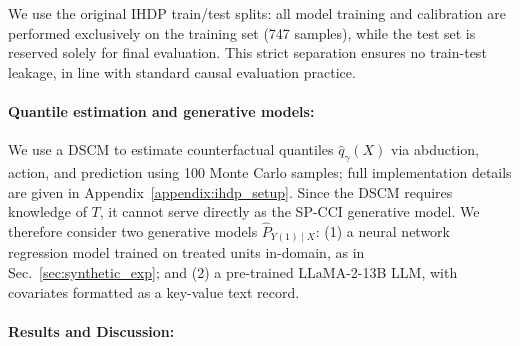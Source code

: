 \documentclass{article}
\theoremstyle{plain}
\theoremstyle{definition}
\theoremstyle{remark}
\begin{document}
We use the original IHDP train/test splits: all model training and calibration are performed exclusively on the training set (747 samples), while the test set is reserved solely for final evaluation. This strict separation ensures no train-test leakage, in line with standard causal evaluation practice.


\paragraph{Quantile estimation and generative models:} We use a DSCM \citep{pawlowski2020deep} to estimate counterfactual quantiles $\hat{q}_\gamma(X)$ via abduction, action, and prediction using 100 Monte Carlo samples; full implementation details are given in Appendix~\ref{appendix:ihdp_setup}. Since the DSCM requires knowledge of $T$, it cannot serve directly as the SP-CCI generative model. We therefore consider two generative models $\hat{P}_{Y(1)\mid X}$: (1) a neural network regression model trained on treated units in-domain, as in Sec.~\ref{sec:synthetic_exp}; and (2) a pre-trained LLaMA-2-13B LLM, with covariates formatted as a key-value text record.





\paragraph{Results and Discussion:}
\begin{table}
\vspace{-0.8em}
\centering
\small
{}
\caption{APIW and CVR on IHDP (50 runs, $\alpha=0.15$). For GESPI, two variants are shown: a lenient guardrail ($\alpha{+}\varepsilon{=}0.15$) and a tight guardrail (small $\varepsilon$). (LQ/MQ/HQ: label quality; LLM: LLaMA-2-13B)}
\label{tab:ihdp_width_results}
\vspace{-0.5em}
\end{table}
\end{document}
